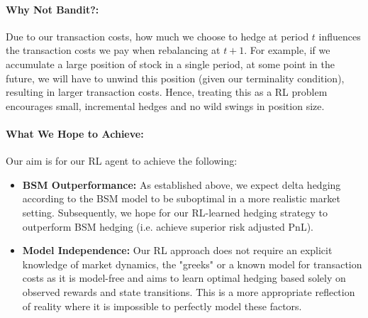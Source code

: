 \documentclass{article}
\begin{document}
\paragraph{Why Not Bandit?:} Due to our transaction costs, how much we choose to hedge at period $t$ influences the transaction costs we pay when rebalancing at $t+1$. For example, if we accumulate a large position of stock in a single period, at some point in the future, we will have to unwind this position (given our terminality condition), resulting in larger transaction costs. Hence, treating this as a RL problem encourages small, incremental hedges and no wild swings in position size.

\paragraph{What We Hope to Achieve:} Our aim is for our RL agent to achieve the following:
\begin{itemize}
    \item \textbf{BSM Outperformance:} As established above, we expect delta hedging according to the BSM model to be suboptimal in a more realistic market setting. Subsequently, we hope for our RL-learned hedging strategy to outperform BSM hedging (i.e. achieve superior risk adjusted PnL).
    \item \textbf{Model Independence:} Our RL approach does not require an explicit knowledge of market dynamics, the "greeks" or a known model for transaction costs as it is model-free and aims to learn optimal hedging based solely on observed rewards and state transitions. This is a more appropriate reflection of reality where it is impossible to perfectly model these factors.
\end{itemize}
\end{document}
